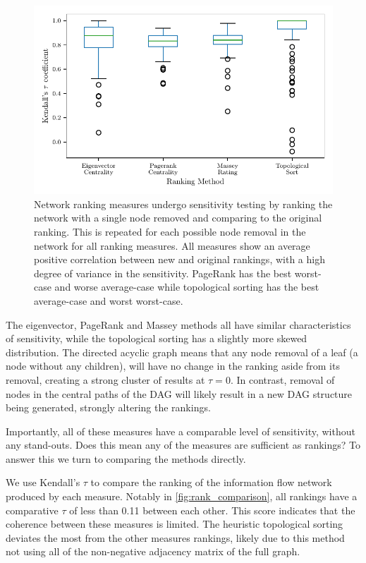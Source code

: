 \begin{figure}[!htbp]
\centering
\includegraphics{chapter4/figs/removal_ranking_boxplot.pdf}
\caption{Network ranking measures undergo sensitivity testing by ranking the network with a single node removed and comparing to the original ranking. This is repeated for each possible node removal in the network for all ranking measures. All measures show an average positive correlation between new and original rankings, with a high degree of variance in the sensitivity. PageRank has the best worst-case and worse average-case while topological sorting has the best average-case and worst worst-case.}\label{fig:rank_boxplots}
\end{figure}

The eigenvector, PageRank and Massey methods all have similar characteristics of sensitivity, while the topological sorting has a slightly more skewed distribution. The directed acyclic graph means that any node removal of a leaf (a node without any children), will have no change in the ranking aside from its removal, creating a strong cluster of results at $\tau=0$. In contrast, removal of nodes in the central paths of the DAG will likely result in a new DAG structure being generated, strongly altering the rankings.

Importantly, all of these measures have a comparable level of sensitivity, without any stand-outs. Does this mean any of the measures are sufficient as rankings? To answer this we turn to comparing the methods directly.

We use Kendall's $\tau$ to compare the ranking of the information flow network produced by each measure. Notably in \autoref{fig:rank_comparison}, all rankings have a comparative $\tau$ of less than 0.11 between each other. This score indicates that the coherence between these measures is limited. The heuristic topological sorting deviates the most from the other measures rankings, likely due to this method not using all of the non-negative adjacency matrix of the full graph.

